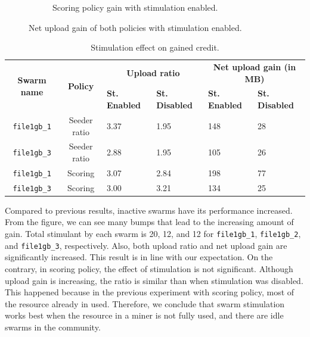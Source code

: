 \begin{figure}[h]
\begin{adjustwidth}{-1.5cm}{}
\begin{subfigure}[t]{0.6\textwidth}
			\caption{Scoring policy gain with stimulation enabled.}
			\label{fig:simplescsrtrig}
		\end{subfigure}
		\caption{Net upload gain of both policies with stimulation enabled.}
	\end{adjustwidth}
\end{figure}

\begin{table}[h]
	\centering
	\caption{Stimulation effect on gained credit.}
	\label{tbl:stimul}
	\begin{adjustwidth}{-1cm}{}
	\begin{tabular}{|c|c|l|l|l|l|}
		\hline
		\multirow{2}{*}{\textbf{Swarm name}} & \multirow{2}{*}{\textbf{Policy}} & \multicolumn{2}{c|}{\textbf{Upload ratio}} & \multicolumn{2}{c|}{\textbf{Net upload gain (in MB)}} \\ \cline{3-6} 
		&  & \textbf{St. Enabled} & \textbf{St. Disabled} & \textbf{St. Enabled} & \textbf{St. Disabled} \\ \hline
		\texttt{file1gb\_1} & Seeder ratio & 3.37 & 1.95 & 148 & 28 \\ \hline
		\texttt{file1gb\_3} & Seeder ratio & 2.88 & 1.95 & 105 & 26 \\ \hline
		\texttt{file1gb\_1} & Scoring & 3.07 & 2.84 & 198 & 77 \\ \hline
		\texttt{file1gb\_3} & Scoring & 3.00 & 3.21 & 134 & 25 \\ \hline
	\end{tabular}
\end{adjustwidth}
\end{table}

Compared to previous results, inactive swarms have  its performance increased. From the figure, we can see many bumps that lead to the increasing amount of gain. Total stimulant by each swarm is 20, 12, and 12 for \texttt{file1gb\_1}, \texttt{file1gb\_2}, and \texttt{file1gb\_3}, respectively. Also, both upload ratio and net upload gain are significantly increased. This result is in line with our expectation. On the contrary, in scoring policy, the effect of stimulation is not significant. Although upload gain is increasing, the ratio is similar than when stimulation was disabled. This happened because in the previous experiment with scoring policy, most of the resource already in used. Therefore, we conclude that swarm stimulation works best when the resource in a miner is not fully used, and there are idle swarms in the community.

